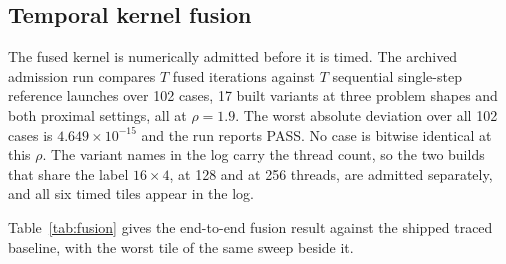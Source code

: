 \subsection{Temporal kernel fusion}
\label{sec:exp:fusion}

The fused kernel is numerically admitted before it is timed. The archived
admission run compares $T$ fused iterations against $T$ sequential single-step
reference launches over 102 cases, 17 built variants at three problem shapes
and both proximal settings, all at $\rho = 1.9$. The worst absolute deviation
over all 102 cases is $4.649 \times 10^{-15}$ and the run reports PASS. No case
is bitwise identical at this $\rho$. The variant names in the log carry the
thread count, so the two builds that share the label $16\times4$, at 128 and at
256 threads, are admitted separately, and all six timed tiles appear in the
log.

Table~\ref{tab:fusion} gives the end-to-end fusion result against the shipped
traced baseline, with the worst tile of the same sweep beside it.

